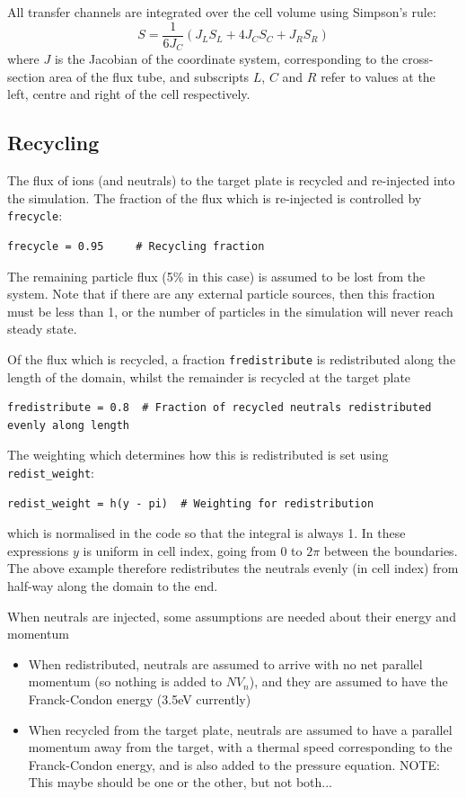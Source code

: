 \documentclass[12pt,a4paper]{article}
\begin{document}
All transfer channels are integrated over the cell volume using Simpson's rule:
\[
S = \frac{1}{6J_C}\left( J_LS_L + 4J_CS_C + J_RS_R \right)
\]
where $J$ is the Jacobian of the coordinate system, corresponding to the
cross-section area of the flux tube, and subscripts $L$, $C$ and $R$ refer
to values at the left, centre and right of the cell respectively.

\subsection{Recycling}

The flux of ions (and neutrals) to the target plate is recycled and re-injected into the simulation. The
fraction of the flux which is re-injected is controlled by \texttt{frecycle}:
\begin{verbatim}
frecycle = 0.95     # Recycling fraction
\end{verbatim}
The remaining particle flux (5\% in this case) is assumed to be lost from the system. Note that
if there are any external particle sources, then this fraction must be less than 1, or the number
of particles in the simulation will never reach steady state.

Of the flux which is recycled, a fraction \texttt{fredistribute} is redistributed along the length
of the domain, whilst the remainder is recycled at the target plate
\begin{verbatim}
fredistribute = 0.8  # Fraction of recycled neutrals redistributed evenly along length
\end{verbatim}
The weighting which determines how this is redistributed is set using \texttt{redist\_weight}:
\begin{verbatim}
redist_weight = h(y - pi)  # Weighting for redistribution
\end{verbatim}
which is normalised in the code so that the integral is always 1.
In these expressions $y$ is uniform in cell index, going from $0$ to $2\pi$ between the boundaries. The
above example therefore redistributes the neutrals evenly (in cell index) from half-way along the domain to the end.

When neutrals are injected, some assumptions are needed about their energy and momentum
\begin{itemize}
\item When redistributed, neutrals are assumed to arrive with no net parallel momentum (so nothing is added to $NV_n$),
  and they are assumed to have the Franck-Condon energy (3.5eV currently)
\item When recycled from the target plate, neutrals are assumed to have a parallel momentum away from the target,
  with a thermal speed corresponding to the Franck-Condon energy, and is also added to the pressure equation.
  NOTE: This maybe should be one or the other, but not both...
\end{itemize}
\end{document}
